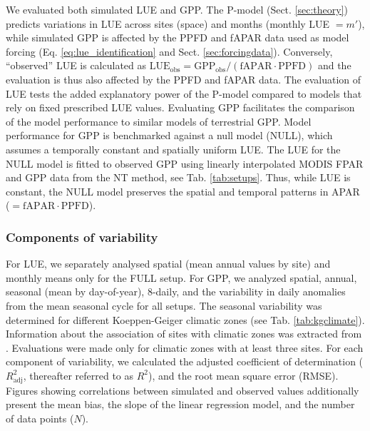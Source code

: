 \documentclass[gmd, manuscript]{copernicus}
\begin{document}
We evaluated both simulated LUE and GPP. The P-model  (Sect. \ref{sec:theory}) predicts variations in LUE across sites (space) and months (monthly LUE $= m'$), while simulated GPP is affected by the PPFD and fAPAR data used as model forcing (Eq. \ref{eq:lue_identification} and Sect. \ref{sec:forcingdata}). Conversely, ``observed'' LUE is calculated as $\text{LUE}_\text{obs} = \text{GPP}_\text{obs} / (\text{fAPAR} \cdot \text{PPFD})$ and the evaluation is thus also affected by the PPFD and fAPAR data. The evaluation of LUE tests the added explanatory power of the P-model compared to models that rely on fixed prescribed LUE values. Evaluating GPP facilitates the comparison of the model performance to similar models of terrestrial GPP. Model performance for GPP is benchmarked against a null model (NULL), which assumes a temporally constant and spatially uniform LUE. The LUE for the NULL model is fitted to observed GPP using linearly interpolated MODIS FPAR and GPP data from the NT method, see Tab. \ref{tab:setups}. Thus, while LUE is constant, the NULL model preserves the spatial and temporal patterns in APAR ($= \text{fAPAR} \cdot \text{PPFD}$).

\subsubsection{Components of variability}
\label{sec:evalmethod_variability}
For LUE, we separately analysed spatial (mean annual values by site) and monthly means only for the FULL setup. For GPP, we analyzed spatial, annual, seasonal (mean by day-of-year), 8-daily, and the variability in daily anomalies from the mean seasonal cycle for all setups. The seasonal variability was determined for different Koeppen-Geiger climatic zones (see Tab. \ref{tab:kgclimate}). Information about the association of sites with climatic zones was extracted from \citet{falge17}. Evaluations were made only for climatic zones with at least three sites. For each component of variability, we calculated the adjusted coefficient of determination ($R^2_\text{adj}$, thereafter referred to as $R^2$), and the root mean square error (RMSE). Figures showing correlations between simulated and observed values additionally present the mean bias, the slope of the linear regression model, and the number of data points ($N$).
\end{document}
